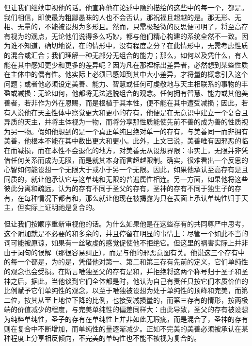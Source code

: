 但让我们继续审视他的话。他宣称他在论述中隐约描绘的这些中的每一个，都是。我们相信，即使最为粗鄙愚昧的人也不会否认，那祝福且超越的是。那无形、无相、无量的，不能被设想为多形且。然而，只需极轻微的反思便可明了，将至高存有视为的观点，无论他们说得多么巧妙，都与他们精心构建的系统全然不一致。因为谁不知道，确切地说，在的情形中，没有程度之分？在此情形中，无需考虑性质的混合或汇合；我们理解一种无部分无组合的能力；那么，如何以及凭什么，有人能在其中感知更少和更多的差异呢？因为凡在那裡标出差异者，必然想到某些性质在主体中的偶有性。他实际上必须已感知到其中大小差异，才将量的概念引入这个问题；或者他必须设定美善、能力、智慧或任何可虔敬地与天主相联系的事物的丰盈或减损：无论如何，他都将无法逃脱组合的观念。任何拥有智慧、能力或其他美善者，若非作为外在恩赐，而是根植于其本性，便不能在其中遭受减损；因此，若有人说他在天主性体中察觉更大和更小的存有，他便是在无意识中建立一个复合且异质的天主，并将主体视为一物，而将分享那性质能使先前不善的成为善的性质视为另一物。假如他想到的是一个真正单纯且绝对单一的存有，与美善同一而非拥有美善，他根本不能在其中数出更大和更小。此外，上文已说，美善唯有因邪恶的临在而减损，而在本性不会退化的地方，对美善无从设想界限：事实上，无限并非凭借任何关系而成为无限，而是就其本身而言超越限制。确实，很难看出一个反思的心智如何能设想一个无限大于或小于另一个无限。因此，如果他承认至高存有是且同质的，就让他承认它与这单纯和无限的普遍属性相连。另一方面，如果他将这些彼此分离和疏远，认为的存有不同于圣父的存有，圣神的存有不同于独生子的存有，在每种情况下都有和，那么就让他现在被揭露为只在表面上承认单纯性归于天主，但实际上证明祂是复合的。\par

但让我们按顺序重新审视他的话。为什么如果他是在这些存有的共同尊严中思考，这个附加就是不必要的和多余的，并且停留在明显的事情上：尽管一个如此不当的词可能被原谅，如果有一丝敬虔的感觉促使他不拒绝它。但这里的祸害实际上并非由于词句的误解（那很容易纠正），而是与他的邪恶意图有关。他说这三个存有中的每一个都是，为的是，凭借他对第一、第二和第三存有先前的定义，它们单纯性的观念也会受损。在断言唯独圣父的存有是和，并拒绝将这两个称号归于圣子和圣神之后，据此，当他谈到它们全体都是时，他认为自己有责任只按它们本质价值的比例赋予它们单纯性的观念，以至于唯独被设想为处于单纯性的顶峰和完美，而第二位，按其从至上地位下降的比例，也接受减损量的，而第三存有的情形，按两极端的价值减少的程度，与完美单纯性的偏差同样大：由此导致，圣父的存有被设想为纯粹单纯性，圣子的存有在单纯性上并非如此无瑕疵，而是混合了，圣神的存有则在复合中不断增加，而单纯性的量逐渐减少。正如不完美的美善必须被承认在某种程度上分享相反倾向，不完美的单纯性也不能不被视为复合的。\par

